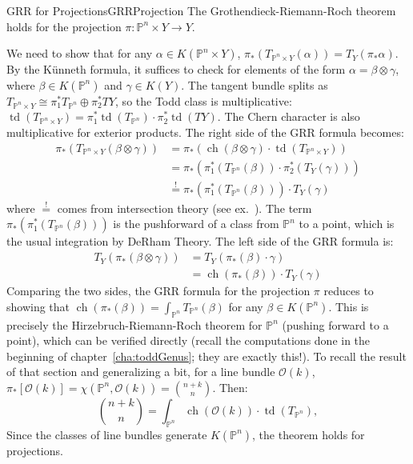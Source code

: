 \documentclass{book}
\newenvironment{Proof}[1][]
  {\begin{ProofTcb}[#1]}
  {\end{ProofTcb}}
\renewcommand{\P}{{\mathbb{P}}}
\newcommand{\CO}{{\mathcal{O}}}
\newcommand{\ch}{{\operatorname{ch}}}
\newcommand{\td}{{\operatorname{td}}}
\renewcommand{\ch}{{\operatorname{ch}}}
\begin{document}
\begin{prop}{GRR for Projections}{GRRProjection}
    The Grothendieck-Riemann-Roch theorem holds for the projection $\pi: \P^n \times Y \to Y$.
\end{prop}
\begin{Proof}
    We need to show that for any $\alpha \in K(\P^n \times Y)$, $\pi_*(T_{\P^n \times Y}(\alpha)) = T_Y(\pi_* \alpha)$. By the Künneth formula, it suffices to check for elements of the form $\alpha = \beta \otimes \gamma$, where $\beta \in K(\P^n)$ and $\gamma \in K(Y)$.
    The tangent bundle splits as $T_{\P^n \times Y} \cong \pi_1^* T_{\P^n} \oplus \pi_2^* TY$, so the Todd class is multiplicative: $\td(T_{\P^n \times Y}) = \pi_1^* \td(T_{\P^n}) \cdot \pi_2^* \td(TY)$. The Chern character is also multiplicative for exterior products.
    The right side of the GRR formula becomes:
    \begin{align*}
        \pi_*(T_{\P^n \times Y}(\beta \otimes \gamma)) &= \pi_*( \ch(\beta \otimes \gamma) \cdot \td(T_{\P^n \times Y}) ) \\
        &= \pi_*( \pi_1^*(T_{\P^n}(\beta)) \cdot \pi_2^*(T_Y(\gamma))) \\
        &\overset{!}{=} \pi_*(\pi_1^*(T_{\P^n}(\beta))) \cdot T_Y(\gamma)
    \end{align*}
    where $\overset{!}{=}$ comes from intersection theory (see ex.~\cite{vakilIntersectionTheory}). The term $\pi_*(\pi_1^*(T_{\P^n}(\beta)))$ is the pushforward of a class from $\P^n$ to a point, which is
    the usual integration by DeRham Theory.
    The left side of the GRR formula is:
    \begin{align*}
        T_Y(\pi_*(\beta \otimes \gamma)) &= T_Y(\pi_*(\beta) \cdot \gamma)\\
        &= \ch(\pi_*(\beta)) \cdot T_Y(\gamma)
    \end{align*}
    Comparing the two sides, the GRR formula for the projection $\pi$ reduces to showing that
    $\ch(\pi_*(\beta)) = \int_{\P^n} T_{\P^n}(\beta)$ for any $\beta \in K(\P^n)$. This is precisely the
    Hirzebruch-Riemann-Roch theorem for $\P^n$ (pushing forward to a point), which can be verified directly
    (recall the computations done in the beginning of chapter~\ref{cha:toddGenus}; they are exactly this!). To
    recall the result of that section and generalizing a bit, for a line bundle $\CO(k)$, $\pi_*[\CO(k)]
    = \chi(\P^n, \CO(k)) = \binom{n+k}{n}$. Then:
    \[ \binom{n+k}{n} = \int_{\P^n} \ch(\CO(k)) \cdot \td(T_{\P^n}), \]
     Since the classes of line bundles generate $K(\P^n)$, the theorem holds for projections.
\end{Proof}
\end{document}
